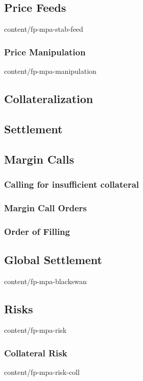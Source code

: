 \documentclass{btswhitepaper}
\begin{document}
\subsection    { Price Feeds                                      }  { content/fp-mpa-stab-feed          } 
\subsubsection { Price Manipulation                               }  { content/fp-mpa-manipulation       } 
\subsection    { Collateralization                                } 
\subsection    { Settlement                                       } 
\subsection    { Margin Calls                                     } 
\subsubsection { Calling for insufficient collateral }
\subsubsection { Margin Call Orders }
\subsubsection { Order of Filling }
\subsection    { Global Settlement                                }  { content/fp-mpa-blackswan          } 

\subsection    { Risks                                            }  { content/fp-mpa-risk               } 
\subsubsection { Collateral Risk                                  }  { content/fp-mpa-risk-coll          } 
\end{document}
